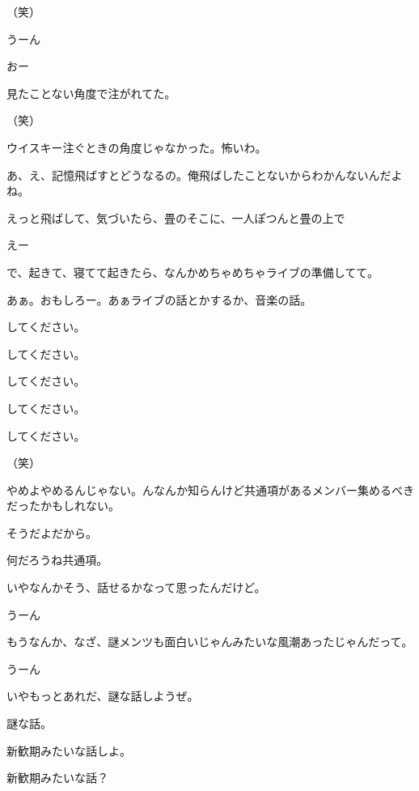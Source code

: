 \begin{multicols}{3}
{        （笑）

        うーん

        おー

        見たことない角度で注がれてた。

        （笑）

        ウイスキー注ぐときの角度じゃなかった。怖いわ。

        あ、え、記憶飛ばすとどうなるの。俺飛ばしたことないからわかんないんだよね。

        えっと飛ばして、気づいたら、畳のそこに、一人ぽつんと畳の上で

        えー

        で、起きて、寝てて起きたら、なんかめちゃめちゃライブの準備してて。

        あぁ。おもしろー。あぁライブの話とかするか、音楽の話。

        してください。

        してください。

        してください。

        してください。

        してください。

        （笑）

        やめよやめるんじゃない。んなんか知らんけど共通項があるメンバー集めるべきだったかもしれない。

        そうだよだから。

        何だろうね共通項。

        いやなんかそう、話せるかなって思ったんだけど。

        うーん

        もうなんか、なざ、謎メンツも面白いじゃんみたいな風潮あったじゃんだって。

        うーん

        いやもっとあれだ、謎な話しようぜ。

        謎な話。

        新歓期みたいな話しよ。

        新歓期みたいな話？

}
\end{multicols}
